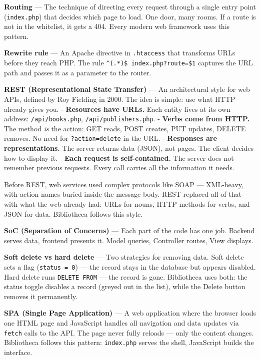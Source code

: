 \documentclass[11pt,a4paper,oneside]{book}
\begin{document}
\textbf{Routing} --- The technique of directing every request
through a single entry point (\texttt{index.php}) that decides
which page to load. One door, many rooms. If a route is not in
the whitelist, it gets a 404. Every modern web framework uses
this pattern.

\textbf{Rewrite rule} --- An Apache directive in
\texttt{.htaccess} that transforms URLs before they reach PHP.
The rule \texttt{\^{}(.*)\$\ index.php?route=\$1} captures the
URL path and passes it as a parameter to the router.

\textbf{REST (Representational State Transfer)} --- An
architectural style for web APIs, defined by Roy Fielding in
2000. The idea is simple: use what HTTP already gives you. -
\textbf{Resources have URLs.} Each entity lives at its own
address: \texttt{/api/books.php}, \texttt{/api/publishers.php}. -
\textbf{Verbs come from HTTP.} The method \emph{is} the action:
GET reads, POST creates, PUT updates, DELETE removes. No need for
\texttt{?action=delete} in the URL. - \textbf{Responses are
representations.} The server returns data (JSON), not pages. The
client decides how to display it. - \textbf{Each request is
self-contained.} The server does not remember previous requests.
Every call carries all the information it needs.

Before REST, web services used complex protocols like SOAP ---
XML-heavy, with action names buried inside the message body. REST
replaced all of that with what the web already had: URLs for
nouns, HTTP methods for verbs, and JSON for data. Bibliotheca
follows this style.

\textbf{SoC (Separation of Concerns)} --- Each part of the code
has one job. Backend serves data, frontend presents it. Model
queries, Controller routes, View displays.

\textbf{Soft delete vs hard delete} --- Two strategies for
removing data. Soft delete sets a flag (\texttt{status\ =\ 0})
--- the record stays in the database but appears disabled. Hard
delete runs \texttt{DELETE\ FROM} --- the record is gone.
Bibliotheca uses both: the status toggle disables a record
(greyed out in the list), while the Delete button removes it
permanently.

\textbf{SPA (Single Page Application)} --- A web application
where the browser loads one HTML page and JavaScript handles all
navigation and data updates via \texttt{fetch} calls to the API.
The page never fully reloads --- only the content changes.
Bibliotheca follows this pattern: \texttt{index.php} serves the
shell, JavaScript builds the interface.
\end{document}
